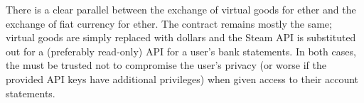 There is a clear parallel between the exchange of virtual goods for ether and the exchange of fiat currency for ether.  The contract remains mostly the same; virtual goods are simply replaced with dollars and the Steam API is substituted out for a (preferably read-only) API for a user's bank statements.  In both cases, the \encname must be trusted not to compromise the user's privacy (or worse if the provided API keys have additional privileges) when given access to their account statements.
\fi


